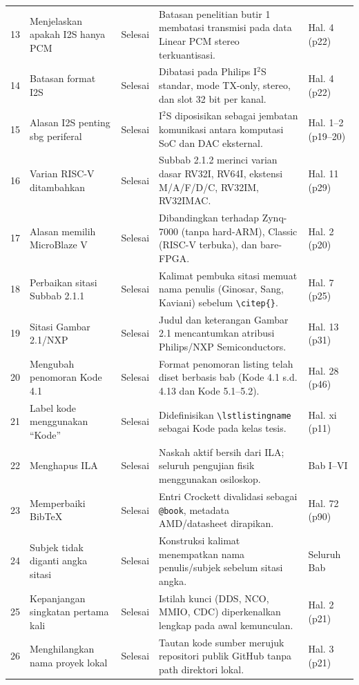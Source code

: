 \documentclass[11pt,a4paper]{article}
\begin{document}
\begin{longtable}{@{}p{0.6cm} p{4.4cm} p{1.5cm} p{7.2cm} p{2.3cm}@{}}
13 & Menjelaskan apakah I2S hanya PCM & Selesai & Batasan penelitian butir 1 membatasi transmisi pada data Linear PCM stereo terkuantisasi. & Hal. 4 (p22) \\
14 & Batasan format I2S & Selesai & Dibatasi pada Philips I$^2$S standar, mode TX-only, stereo, dan slot 32 bit per kanal. & Hal. 4 (p22) \\
15 & Alasan I2S penting sbg periferal & Selesai & I$^2$S diposisikan sebagai jembatan komunikasi antara komputasi SoC dan DAC eksternal. & Hal. 1--2 (p19--20) \\
16 & Varian RISC-V ditambahkan & Selesai & Subbab 2.1.2 merinci varian dasar RV32I, RV64I, ekstensi M/A/F/D/C, RV32IM, RV32IMAC. & Hal. 11 (p29) \\
17 & Alasan memilih MicroBlaze V & Selesai & Dibandingkan terhadap Zynq-7000 (tanpa hard-ARM), Classic (RISC-V terbuka), dan bare-FPGA. & Hal. 2 (p20) \\
18 & Perbaikan sitasi Subbab 2.1.1 & Selesai & Kalimat pembuka sitasi memuat nama penulis (Ginosar, Sang, Kaviani) sebelum \texttt{\textbackslash citep\{\}}. & Hal. 7 (p25) \\
19 & Sitasi Gambar 2.1/NXP & Selesai & Judul dan keterangan Gambar 2.1 mencantumkan atribusi Philips/NXP Semiconductors. & Hal. 13 (p31) \\
20 & Mengubah penomoran Kode 4.1 & Selesai & Format penomoran listing telah diset berbasis bab (Kode 4.1 s.d. 4.13 dan Kode 5.1--5.2). & Hal. 28 (p46) \\
21 & Label kode menggunakan ``Kode'' & Selesai & Didefinisikan \texttt{\textbackslash lstlistingname} sebagai Kode pada kelas tesis. & Hal. xi (p11) \\
22 & Menghapus ILA & Selesai & Naskah aktif bersih dari ILA; seluruh pengujian fisik menggunakan osiloskop. & Bab I--VI \\
23 & Memperbaiki BibTeX & Selesai & Entri Crockett divalidasi sebagai \texttt{@book}, metadata AMD/datasheet dirapikan. & Hal. 72 (p90) \\
24 & Subjek tidak diganti angka sitasi & Selesai & Konstruksi kalimat menempatkan nama penulis/subjek sebelum sitasi angka. & Seluruh Bab \\
25 & Kepanjangan singkatan pertama kali & Selesai & Istilah kunci (DDS, NCO, MMIO, CDC) diperkenalkan lengkap pada awal kemunculan. & Hal. 2 (p21) \\
26 & Menghilangkan nama proyek lokal & Selesai & Tautan kode sumber merujuk repositori publik GitHub tanpa path direktori lokal. & Hal. 3 (p21) \\

\end{longtable}
\end{document}
